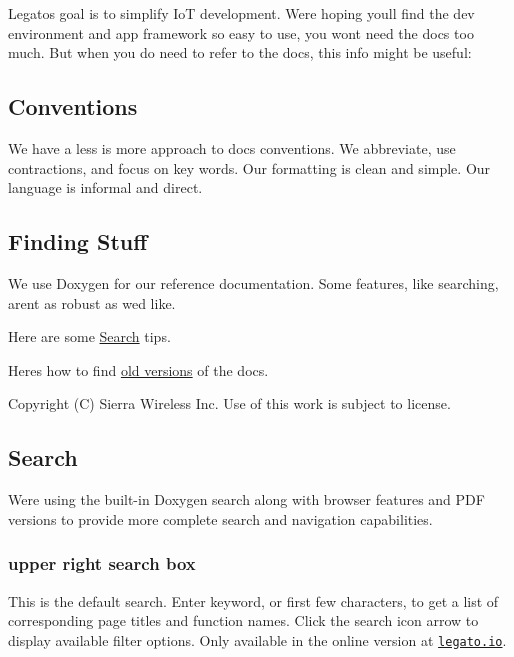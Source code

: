 Legato\textquotesingle{}s goal is to simplify Io\+T development. We\textquotesingle{}re hoping you\textquotesingle{}ll find the dev environment and app framework so easy to use, you won\textquotesingle{}t need the docs too much. But when you do need to refer to the docs, this info might be useful\+:

\subsection*{Conventions}

We have a less is more approach to docs\textquotesingle{} conventions. We abbreviate, use contractions, and focus on key words. Our formatting is clean and simple. Our language is informal and direct.

\subsection*{Finding Stuff}

We use Doxygen for our reference documentation. Some features, like searching, aren\textquotesingle{}t as robust as we\textquotesingle{}d like.

Here are some \hyperlink{aboutDocsSearch}{Search} tips.

Here\textquotesingle{}s how to find \hyperlink{aboutDocsVersion}{old versions} of the docs.





Copyright (C) Sierra Wireless Inc. Use of this work is subject to license. \hypertarget{aboutDocsSearch}{}\subsection{Search}\label{aboutDocsSearch}
We\textquotesingle{}re using the built-\/in Doxygen search along with browser features and P\+D\+F versions to provide more complete search and navigation capabilities.

\subsubsection*{upper right search box}

This is the default search. Enter keyword, or first few characters, to get a list of corresponding page titles and function names. Click the search icon arrow to display available filter options. Only available in the online version at \href{http://www.legato.io/legato-docs/}{\tt legato.\+io}.

